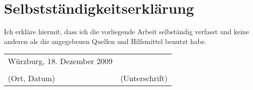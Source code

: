 \documentclass{article}
\begin{document}
\section*{Selbstst{\"a}ndigkeitserkl{\"a}rung}
Ich erkl{\"a}re hiermit, dass ich die vorliegende Arbeit selbst{\"a}ndig verfasst und keine anderen als die angegebenen Quellen und Hilfsmittel benutzt habe.
\vspace{5cm}

\begin{tabular}{ll}
W{\"u}rzburg, 18. Dezember 2009 & \dotfill\\
 & \\
(Ort, Datum)\hspace{1cm} & (Unterschrift)\hspace{5cm}
\end{tabular}
\end{document}
